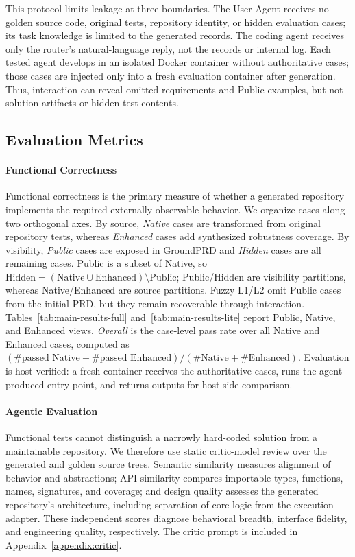 This protocol limits leakage at three boundaries. The User Agent receives no golden source code, original tests, repository identity, or hidden evaluation cases; its task knowledge is limited to the generated records. The coding agent receives only the router's natural-language reply, not the records or internal log. Each tested agent develops in an isolated Docker container without authoritative cases; those cases are injected only into a fresh evaluation container after generation. Thus, interaction can reveal omitted requirements and Public examples, but not solution artifacts or hidden test contents.


\subsection{Evaluation Metrics}
\label{sec:metrics}

\paragraph{Functional Correctness}
Functional correctness is the primary measure of whether a generated repository implements the required externally observable behavior. We organize cases along two orthogonal axes. By source, \emph{Native} cases are transformed from original repository tests, whereas \emph{Enhanced} cases add synthesized robustness coverage. By visibility, \emph{Public} cases are exposed in GroundPRD and \emph{Hidden} cases are all remaining cases. Public is a subset of Native, so $\mathrm{Hidden}=(\mathrm{Native}\cup\mathrm{Enhanced})\setminus\mathrm{Public}$; Public/Hidden are visibility partitions, whereas Native/Enhanced are source partitions. Fuzzy L1/L2 omit Public cases from the initial PRD, but they remain recoverable through interaction. Tables~\ref{tab:main-results-full} and~\ref{tab:main-results-lite} report Public, Native, and Enhanced views. \emph{Overall} is the case-level pass rate over all Native and Enhanced cases, computed as $(\#\text{passed Native}+\#\text{passed Enhanced})/(\#\text{Native}+\#\text{Enhanced})$. Evaluation is host-verified: a fresh container receives the authoritative cases, runs the agent-produced entry point, and returns outputs for host-side comparison.

\paragraph{Agentic Evaluation}
Functional tests cannot distinguish a narrowly hard-coded solution from a maintainable repository. We therefore use static critic-model review over the generated and golden source trees. Semantic similarity measures alignment of behavior and abstractions; API similarity compares importable types, functions, names, signatures, and coverage; and design quality assesses the generated repository's architecture, including separation of core logic from the execution adapter. These independent scores diagnose behavioral breadth, interface fidelity, and engineering quality, respectively. The critic prompt is included in Appendix~\ref{appendix:critic}.

